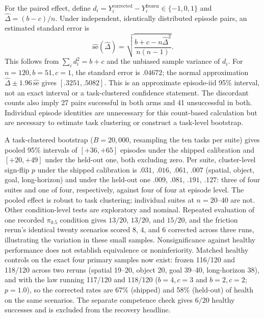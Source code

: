 For the paired effect, define $d_i=Y_i^{\mathrm{corrected}}-Y_i^{\mathrm{frozen}}
\in\{-1,0,1\}$ and $\widehat\Delta=(b-c)/n$. Under independent, identically
distributed episode pairs, an estimated standard error is
\begin{equation}
 \widehat{\mathrm{se}}(\widehat\Delta)
 =\sqrt{\frac{b+c-n\widehat\Delta^2}{n(n-1)}}.
 \label{eq:paired-se}
\end{equation}
This follows from $\sum_i d_i^2=b+c$ and the unbiased sample variance of $d_i$.
For $n=120,b=51,c=1$, the standard error is $.04672$; the normal approximation
$\widehat\Delta\pm1.96\,\widehat{\mathrm{se}}$ gives $[.3251,.5082]$.
This is an approximate episode-iid 95\% interval, not an exact interval or a
task-clustered confidence statement. The discordant counts also imply 27 pairs
successful in both arms and 41 unsuccessful in both. Individual episode identities
are unnecessary for this count-based calculation but are necessary to estimate
task clustering or construct a task-level bootstrap.

A task-clustered bootstrap ($B=20{,}000$, resampling the ten tasks per
suite) gives pooled 95\% intervals of $[+36,+65]$ episodes under the shipped
calibration and $[+20,+49]$ under the held-out one, both excluding zero.
Per suite, cluster-level sign-flip $p$ under the shipped calibration is
$.031$, $.016$, $.061$, $.007$ (spatial, object, goal, long-horizon) and
under the held-out one $.009$, $.081$, $.191$, $.127$: three of four suites
and one of four, respectively, against four of four at episode level. The
pooled effect is robust to task clustering; individual suites at $n=20$--$40$
are not.
Other condition-level tests are exploratory and nominal.
Repeated evaluation of one recorded $\pi_{0.5}$ condition gives $13/20$,
$13/20$, and $15/20$, and the friction rerun's identical twenty scenarios
scored $8$, $4$, and $6$ corrected across three runs, illustrating the
variation in these small samples. Nonsignificance
against healthy performance does not establish equivalence or noninferiority.
Matched healthy controls on the exact four primary samples now exist:
frozen 116/120 and 118/120 across two reruns (spatial 19--20, object 20,
goal 39--40, long-horizon 38), and with the law running 117/120 and 118/120
($b{=}4,c{=}3$ and $b{=}2,c{=}2$; $p=1.0$), so the corrected rates are 67\%
(shipped) and 58\% (held-out) of health on the same scenarios. The separate
 competence check gives $6/20$ healthy successes and is
excluded from the recovery headline.

